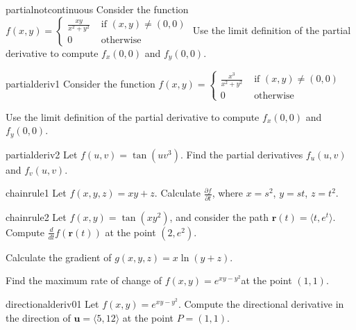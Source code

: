 \begin{problem}{partialnotcontinuous}
    Consider the function $f(x,y) = \left\{
		\begin{array}{ll}
			\frac{xy}{x^2 + y^2} & \text{ if } (x,y) \neq (0,0) \\
			0 & \text{ otherwise } 
		\end{array}
		\right.$  Use the limit definition of the partial derivative to compute $f_x(0,0)$ and $f_y(0,0)$.
\end{problem}

\begin{problem}{partialderiv1}
    Consider the function $f(x,y) = \left\{
		\begin{array}{ll}
			\frac{x^3}{x^2 + y^2} & \text{ if } (x,y) \neq (0,0) \\
			0 & \text{ otherwise } 
		\end{array}
		\right.$
		
		Use the limit definition of the partial derivative to compute $f_x(0,0)$ and $f_y(0,0)$.
\end{problem}

\begin{problem}{partialderiv2}
    Let $f(u,v) = \tan(uv^3)$.  Find the partial derivatives $f_u(u,v)$ and $f_v(u,v)$.
\end{problem}


\begin{problem}{chainrule1}
    Let $f(x,y,z) = xy + z$.  Calculate $\frac{\partial f}{\partial t}$, where $x = s^2$, $y = st$, $z = t^2$.
\end{problem}

\begin{problem}{chainrule2}
    Let $f(x,y) = \tan(xy^2)$, and consider the path $\bm{r}(t) = \langle t, e^t \rangle$.  Compute $\frac{d}{dt}f(\bm{r}(t))$ at the point $(2,e^2)$.
\end{problem}

\begin{problem}
    Calculate the gradient of $g(x,y,z) = x\ln(y+z)$.
\end{problem}


\begin{problem}
    Find the maximum rate of change of $f(x,y) = e^{xy-y^2}$at the point $(1,1)$.
\end{problem}

\begin{problem}{directionalderiv01}
    Let $f(x,y) = e^{xy-y^2}$. Compute the directional derivative in the direction of $\bm{u} = \langle 5, 12 \rangle$ at the point $P = (1,1)$.
\end{problem}

